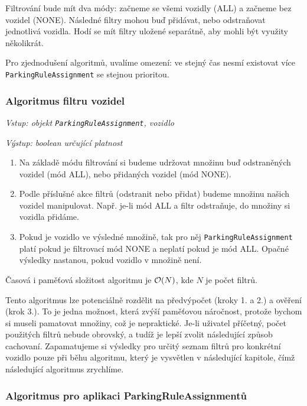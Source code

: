 Filtrování bude mít dva módy: začneme se všemi vozidly (ALL) a začneme bez vozidel (NONE).
Následné filtry mohou buď přidávat, nebo odstraňovat jednotlivá vozidla.
Hodí se mít filtry uložené separátně, aby mohli být využity několikrát.

Pro zjednodušení algoritmů, uvalíme omezení: ve stejný čas nesmí existovat více \texttt{ParkingRuleAssignment}
se stejnou prioritou.

\subsubsection*{Algoritmus filtru vozidel}

\textit{Vstup: objekt \texttt{ParkingRuleAssignment}, vozidlo}

\textit{Výstup: boolean určující platnost}
\begin{enumerate}
  \item Na základě módu filtrování si budeme udržovat množinu buď odstraněných vozidel (mód ALL), nebo přidaných vozidel (mód NONE).
  \item Podle příslušné akce filtrů (odstranit nebo přidat) budeme množinu našich vozidel manipulovat. Např. je-li mód ALL a filtr odstraňuje, do množiny si vozidla přidáme.
  \item Pokud je vozidlo ve výsledné množině, tak pro něj \texttt{ParkingRuleAssignment} platí pokud je filtrovací mód NONE a neplatí pokud je mód ALL. Opačné výsledky nastanou, pokud vozidlo v množině není.
\end{enumerate}

Časová i paměťová složitost algoritmu je ${\cal O}(N)$, kde $N$ je počet filtrů.

Tento algoritmus lze potenciálně rozdělit na předvýpočet (kroky 1. a 2.) a ověření (krok 3.).
To je jedna možnost, která zvýší paměťovou náročnost, protože bychom si museli pamatovat množiny, což je nepraktické.
Je-li uživatel příčetný, počet použitých filtrů nebude obrovský, a tudíž je lepší zvolit následující způsob cachovaní.
Zapamatujeme si výsledky pro určitý seznam filtrů pro konkrétní vozidlo pouze při běhu algoritmu, který je
vysvětlen v následující kapitole, čímž následující algoritmus zrychlíme.

\subsubsection*{Algoritmus pro aplikaci ParkingRuleAssignmentů}

